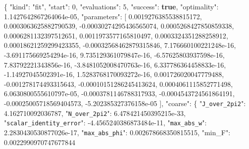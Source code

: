 \documentclass[
  10pt,
]{article}
\newenvironment{Shaded}{}{}
\newcommand{\DataTypeTok}[1]{\textcolor[rgb]{0.56,0.13,0.00}{#1}}
\newcommand{\DecValTok}[1]{\textcolor[rgb]{0.25,0.63,0.44}{#1}}
\newcommand{\FloatTok}[1]{\textcolor[rgb]{0.25,0.63,0.44}{#1}}
\newcommand{\FunctionTok}[1]{\textcolor[rgb]{0.02,0.16,0.49}{#1}}
\newcommand{\KeywordTok}[1]{\textcolor[rgb]{0.00,0.44,0.13}{\textbf{#1}}}
\newcommand{\OtherTok}[1]{\textcolor[rgb]{0.00,0.44,0.13}{#1}}
\newcommand{\StringTok}[1]{\textcolor[rgb]{0.25,0.44,0.63}{#1}}
\begin{document}
\begin{Shaded}
\begin{Highlighting}[]
\FunctionTok{\{}
  \DataTypeTok{"kind"}\FunctionTok{:} \StringTok{"fit"}\FunctionTok{,}
  \DataTypeTok{"start"}\FunctionTok{:} \DecValTok{0}\FunctionTok{,}
  \DataTypeTok{"evaluations"}\FunctionTok{:} \DecValTok{5}\FunctionTok{,}
  \DataTypeTok{"success"}\FunctionTok{:} \KeywordTok{true}\FunctionTok{,}
  \DataTypeTok{"optimality"}\FunctionTok{:} \FloatTok{1.1427642867264064e{-}05}\FunctionTok{,}
  \DataTypeTok{"parameters"}\FunctionTok{:} \OtherTok{[}
    \FloatTok{0.0019276385538815172}\OtherTok{,}
    \FloatTok{0.0003063625882790539}\OtherTok{,}
    \FloatTok{{-}0.00030274295436565074}\OtherTok{,}
    \FloatTok{0.0005268427850859338}\OtherTok{,}
    \FloatTok{0.0006281132397512651}\OtherTok{,}
    \FloatTok{0.0011973577165810497}\OtherTok{,}
    \FloatTok{0.0003324351288258912}\OtherTok{,}
    \FloatTok{0.00018621259299423355}\OtherTok{,}
    \FloatTok{{-}0.00032568462879315846}\OtherTok{,}
    \FloatTok{7.176660100221248e{-}16}\OtherTok{,}
    \FloatTok{{-}3.691175669254294e{-}16}\OtherTok{,}
    \FloatTok{9.735129361079847e{-}16}\OtherTok{,}
    \FloatTok{{-}6.57625803937598e{-}16}\OtherTok{,}
    \FloatTok{7.83792221343856e{-}16}\OtherTok{,}
    \FloatTok{{-}3.8481052008470763e{-}16}\OtherTok{,}
    \FloatTok{6.337786364458833e{-}16}\OtherTok{,}
    \FloatTok{{-}1.14927045502391e{-}16}\OtherTok{,}
    \FloatTok{1.5283768170093272e{-}16}\OtherTok{,}
    \FloatTok{0.001726020047779488}\OtherTok{,}
    \FloatTok{{-}0.001278174493315643}\OtherTok{,}
    \FloatTok{{-}0.00010151286245413624}\OtherTok{,}
    \FloatTok{0.0004061115852771498}\OtherTok{,}
    \FloatTok{6.0630800555610797e{-}05}\OtherTok{,}
    \FloatTok{{-}0.0003781146788317933}\OtherTok{,}
    \FloatTok{{-}0.0004543724561864191}\OtherTok{,}
    \FloatTok{{-}0.00025005718569404573}\OtherTok{,}
    \FloatTok{{-}5.202385327376158e{-}05}
  \OtherTok{]}\FunctionTok{,}
  \DataTypeTok{"coarse"}\FunctionTok{:} \FunctionTok{\{}
    \DataTypeTok{"\nolinkurl{J_over_2pi2}"}\FunctionTok{:} \FloatTok{4.162710092036787}\FunctionTok{,}
    \DataTypeTok{"\nolinkurl{N_over_2pi2}"}\FunctionTok{:} \FloatTok{6.478421450395215e{-}33}\FunctionTok{,}
    \DataTypeTok{"\nolinkurl{scalar_identity_error}"}\FunctionTok{:} \FloatTok{{-}4.4565240386873484e{-}11}\FunctionTok{,}
    \DataTypeTok{"\nolinkurl{max_abs_w}"}\FunctionTok{:} \FloatTok{2.2830430530877026e{-}17}\FunctionTok{,}
    \DataTypeTok{"\nolinkurl{max_abs_phi}"}\FunctionTok{:} \FloatTok{0.002678668350815515}\FunctionTok{,}
    \DataTypeTok{"min\_F"}\FunctionTok{:} \FloatTok{0.0022990970747677844}

\end{Highlighting}
\end{Shaded}
\end{document}
